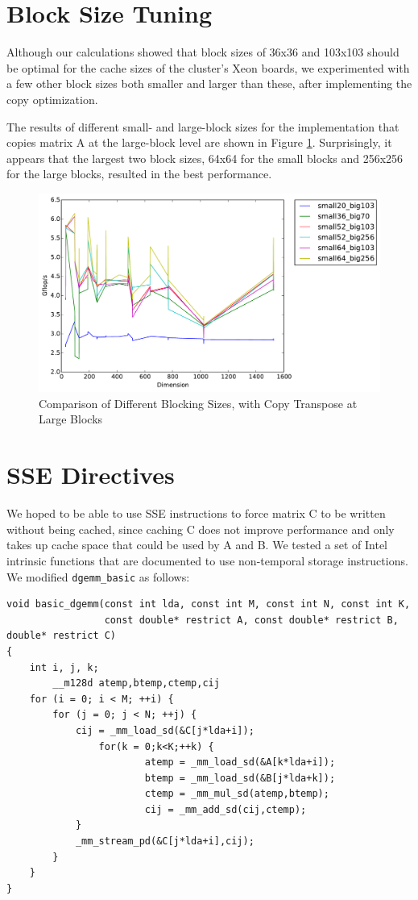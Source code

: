\documentclass[letterpaper]{article}	 %
\begin{document}
\section{Block Size Tuning}
Although our calculations showed that block sizes of 36x36 and 103x103 should be optimal for the cache sizes of the cluster's Xeon boards, we experimented with a few other block sizes both smaller and larger than these, after implementing the copy optimization.

The results of different small- and large-block sizes for the implementation that copies matrix A at the large-block level are shown in Figure \ref{fig:l2blocking}. Surprisingly, it appears that the largest two block sizes, 64x64 for the small blocks and 256x256 for the large blocks, resulted in the best performance.

\begin{figure}[H]
\centering
  \centering
  \includegraphics[width=.6\linewidth]{timing-blocksizes-l2transpose.pdf}
  \caption{Comparison of Different Blocking Sizes, with Copy Transpose at Large Blocks}
  \label{fig:l2blocking}
\end{figure}


\section{SSE Directives}

We hoped to be able to use SSE instructions to force matrix C to be written without being cached, since caching C does not improve performance and only takes up cache space that could be used by A and B. We tested a set of Intel intrinsic functions that are documented to use non-temporal storage instructions. We modified \texttt{dgemm\_basic} as follows:

\begin{verbatim}
void basic_dgemm(const int lda, const int M, const int N, const int K,
                 const double* restrict A, const double* restrict B, double* restrict C)
{
    int i, j, k;
        __m128d atemp,btemp,ctemp,cij
    for (i = 0; i < M; ++i) {
        for (j = 0; j < N; ++j) {
            cij = _mm_load_sd(&C[j*lda+i]);
                for(k = 0;k<K;++k) {
                        atemp = _mm_load_sd(&A[k*lda+i]);
                        btemp = _mm_load_sd(&B[j*lda+k]);
                        ctemp = _mm_mul_sd(atemp,btemp);
                        cij = _mm_add_sd(cij,ctemp);
            }
            _mm_stream_pd(&C[j*lda+i],cij);
        }
    }
}
\end{verbatim}
\end{document}
